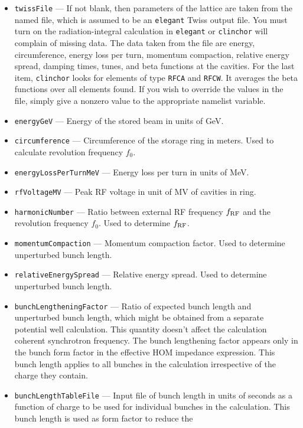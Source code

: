\documentclass[11pt]{article}
\begin{document}
\begin{itemize}
\item {\tt twissFile} --- If not blank, then parameters of the lattice are
 taken from the named file, which is assumed to be an {\tt elegant} Twiss output
 file. You must turn on the radiation-integral calculation in {\tt elegant} or
 {\tt clinchor} will complain of missing data.  The data taken from the file are
 energy, circumference, energy loss per turn, momentum compaction, relative
 energy spread, damping times, tunes, and beta functions at the cavities.
 For the last item, {\tt clinchor} looks for elements of type {\tt RFCA} and
 {\tt RFCW}.  It averages the beta functions over all elements found.
 If you wish to override the values in the file, simply give a nonzero  
 value to the appropriate namelist variable.
\item {\tt energyGeV} --- Energy of the stored beam in units of GeV.
\item {\tt circumference} --- Circumference of the storage ring in
      meters. Used to calculate revolution frequency $f_0$.
\item {\tt energyLossPerTurnMeV} --- Energy loss per turn in units of MeV.
\item {\tt rfVoltageMV} --- Peak RF voltage in unit of MV of cavities in ring.
\item {\tt harmonicNumber} --- Ratio between external RF frequency
      $f_{\rm RF}$ and the revolution frequency $f_0$.  Used to
      determine $f_{\rm RF}$.
\item {\tt momentumCompaction} --- Momentum compaction factor. Used to
      determine unperturbed bunch length.
\item {\tt relativeEnergySpread} --- Relative energy spread. Used to
      determine unperturbed bunch length.
\item {\tt bunchLengtheningFactor} --- Ratio of expected bunch length
      and unperturbed bunch length, which might be obtained from a
      separate potential well calculation.  This quantity doesn't
      affect the calculation coherent synchrotron frequency. The bunch
      lengthening factor appears only in the bunch form factor in the
      effective HOM impedance expression. This bunch length applies to 
      all bunches in the calculation irrespective of the charge they contain.
\item {\tt bunchLengthTableFile} ---  Input file of bunch length in units of seconds
      as a function of charge to be used for individual bunches in the
      calculation. This bunch length is used as form factor to reduce the

\end{itemize}
\end{document}
